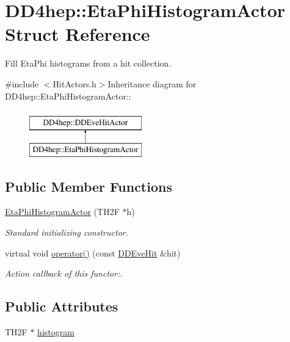 \hypertarget{struct_d_d4hep_1_1_eta_phi_histogram_actor}{
\section{DD4hep::EtaPhiHistogramActor Struct Reference}
\label{struct_d_d4hep_1_1_eta_phi_histogram_actor}
}


Fill EtaPhi histograms from a hit collection.  


{\ttfamily \#include $<$HitActors.h$>$}Inheritance diagram for DD4hep::EtaPhiHistogramActor::\begin{figure}[H]
\begin{center}
\leavevmode
\includegraphics[height=2cm]{struct_d_d4hep_1_1_eta_phi_histogram_actor}
\end{center}
\end{figure}
\subsection*{Public Member Functions}
\begin{DoxyCompactItemize}
\item 
\hyperlink{struct_d_d4hep_1_1_eta_phi_histogram_actor_a241688f10ff3ad7002b0403a84a8609e}{EtaPhiHistogramActor} (TH2F $\ast$h)
\begin{DoxyCompactList}\small\item\em Standard initializing constructor. \item\end{DoxyCompactList}\item 
virtual void \hyperlink{struct_d_d4hep_1_1_eta_phi_histogram_actor_ae0ab6bd1064a336f7cb3f1592a70e063}{operator()} (const \hyperlink{class_d_d4hep_1_1_d_d_eve_hit}{DDEveHit} \&hit)
\begin{DoxyCompactList}\small\item\em Action callback of this functor:. \item\end{DoxyCompactList}\end{DoxyCompactItemize}
\subsection*{Public Attributes}
\begin{DoxyCompactItemize}
\item 
TH2F $\ast$ \hyperlink{struct_d_d4hep_1_1_eta_phi_histogram_actor_abe7d6a7db6da3c8ee5c77d718c39b2e0}{histogram}
\end{DoxyCompactItemize}


